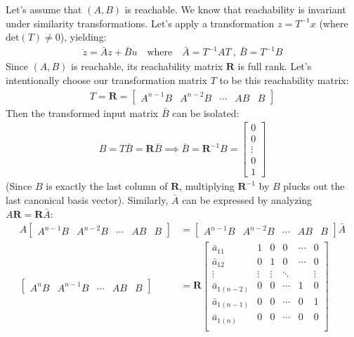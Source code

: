\documentclass[twoside, 11pt, a4paper]{article}
\begin{document}
Let's assume that $(A,B)$ is reachable. We know that reachability is invariant under similarity transformations. Let's apply a transformation $z = T^{-1} x$ (where $\mathrm{det}(T) \neq 0$), yielding:
%
\begin{align*}
	\dot{z} = \bar{A} z + \bar{B} u \quad \text{where} \quad \bar{A} = T^{-1} A T \ , \ \bar{B} = T^{-1} B 
\end{align*}
%
Since $(A,B)$ is reachable, its reachability matrix $\mathbf{R}$ is full rank. Let's intentionally choose our transformation matrix $T$ to be this reachability matrix:
%
\begin{align*}
T = \mathbf{R} = \left[ \begin{array}{c|c|c|c|c} A^{n-1} B & A^{n-2} B & \cdots & A B &  B \end{array} \right]
\end{align*}
%
Then the transformed input matrix $\bar{B}$ can be isolated:
% 
\begin{align*}
B = T \bar{B} = \mathbf{R} \bar{B} \implies \bar{B} = \mathbf{R}^{-1} B = \begin{bmatrix} 0 \\ 0 \\ \vdots \\ 0 \\ 1 \end{bmatrix}
\end{align*}
%
(Since $B$ is exactly the last column of $\mathbf{R}$, multiplying $\mathbf{R}^{-1}$ by $B$ plucks out the last canonical basis vector). Similarly, $\bar{A}$ can be expressed by analyzing $A \mathbf{R} = \mathbf{R} \bar{A}$:
\begin{align*}
A \left[ \begin{array}{c|c|c|c|c} A^{n-1} B & A^{n-2} B & \cdots & A B &  B \end{array} \right] &= \left[ \begin{array}{c|c|c|c|c} A^{n-1} B & A^{n-2} B & \cdots & A B &  B \end{array} \right] \bar{A}
\\
\left[ \begin{array}{c|c|c|c|c} A^{n} B & A^{n-1} B & \cdots & A B &  B \end{array} \right] &= \mathbf{R} \left[ \begin{array}{c|c|c|c|c|c} 
\bar{a}_{11} & 1 & 0 & 0 & \cdots & 0 \\
\bar{a}_{12} & 0 & 1 &  0 & \cdots & 0 \\
\vdots & \vdots & \vdots & \ddots &  & \vdots \\
\bar{a}_{1(n-2)} & 0 & 0 & \cdots  & 1 & 0 \\
\bar{a}_{1(n-1)} & 0 & 0 & \cdots  & 0 & 1 \\
\bar{a}_{1(n)} & 0 & 0 & \cdots  & 0 & 0 \\
\end{array} 
\right] 
\end{align*}
\end{document}
